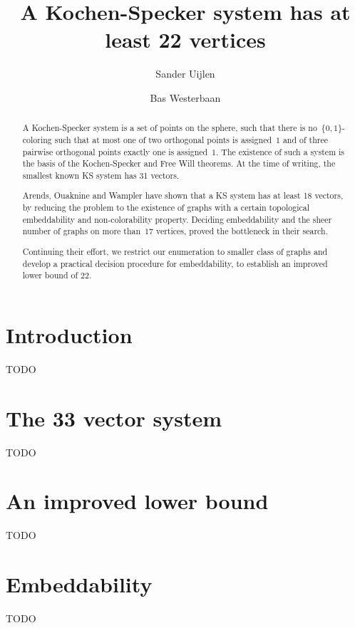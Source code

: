 \documentclass[a4paper]{article}
\title{A Kochen-Specker system has at least 22 vertices}
\author{Sander Uijlen}
\author{Bas Westerbaan}
\affil{Institute for Computing and Information Sciences\\
       Radboud Universiteit Nijmegen\\
   \{\texttt{suijlen},\texttt{bwesterb}\}\texttt{@cs.ru.nl}}
\begin{document}
\maketitle

\begin{abstract}
    A Kochen-Specker system is a set of points on the sphere,
    such that there is no~$\{0,1\}$-coloring such that
    at most one of two orthogonal points is assigned~$1$
    and of three pairwise orthogonal points exactly one
    is assigned~$1$.
    The existence of such a system is the basis of the Kochen-Specker
    and Free Will theorems.  At the time of writing, the smallest known
    KS system has 31 vectors.  

    Arends, Ouaknine and Wampler have shown that a KS system has at least
    18 vectors, by reducing the problem to the existence of graphs
    with a certain topological embeddability and non-colorability property.
    Deciding embeddability and the sheer number of graphs on more than~$17$
    vertices, proved the bottleneck in their search.

    Continuing their effort, we restrict our enumeration to smaller class of
    graphs and develop a practical decision procedure for embeddability, to
    establish an improved lower bound of 22.
\end{abstract}
    
\section{Introduction}
TODO

\section{The 33 vector system}
TODO

\section{An improved lower bound}
TODO

\section{Embeddability}
TODO

{}

\end{document}
